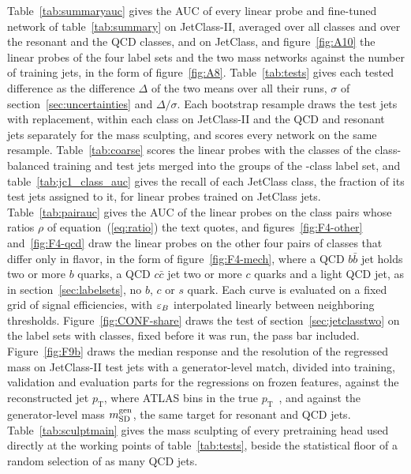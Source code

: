 Table~\ref{tab:summaryauc} gives the AUC of every linear probe and fine-tuned network of table~\ref{tab:summary}
on JetClass-II, averaged over all classes and over the resonant and the QCD classes, and on JetClass, and
figure~\ref{fig:A10} the linear probes of the four label sets and the two mass networks
against the number of training jets, in the form of figure~\ref{fig:A8}. Table~\ref{tab:tests} gives each tested
difference as the difference $\Delta$ of the two means over all their runs, $\sigma$ of
section~\ref{sec:uncertainties} and $\Delta/\sigma$. Each bootstrap resample draws the test jets with replacement,
within each class on JetClass-II and the QCD and resonant jets separately for the mass sculpting, and scores every
network on the same resample. Table~\ref{tab:coarse} scores the linear probes with the \Kfull{} classes of the
class-balanced training and test jets merged into the \Kcoarse{} groups of the \Kcoarse-class label set, and
table~\ref{tab:jc1_class_auc} gives the recall of
each JetClass class, the fraction of its test jets assigned to it, for linear probes trained on \FtSizeESix{}
JetClass jets. Table~\ref{tab:pairauc} gives the AUC of the linear probes on the class pairs whose ratios $\rho$ of
equation~(\ref{eq:ratio}) the text quotes, and figures~\ref{fig:F4-other} and~\ref{fig:F4-qcd} draw the linear probes on the other four pairs of
classes that differ only in flavor, in the form of figure~\ref{fig:F4-mech}, where a QCD $b\bar b$ jet holds two or more $b$ quarks, a
QCD $c\bar c$ jet two or more $c$ quarks and a light QCD jet, as in section~\ref{sec:labelsets}, no $b$, $c$ or $s$ quark. Each curve is evaluated on
a fixed grid of signal efficiencies, with $\varepsilon_B$ interpolated linearly between neighboring thresholds.
Figure~\ref{fig:CONF-share} draws the test of section~\ref{sec:jetclasstwo} on the label sets with \Kcoarse{}
classes, fixed before it was run, the pass bar included.
Figure~\ref{fig:F9b} draws the median response and the resolution of the regressed mass on JetClass-II test jets
with a generator-level match, divided into training, validation and evaluation parts for the regressions on
frozen features, against the reconstructed jet $p_{\mathrm T}$, where ATLAS bins in the true
$p_{\mathrm T}$~\cite[Sec.~6]{atlasregression}, and against the generator-level mass $m^{\mathrm{gen}}_{\mathrm{SD}}$, the same target for
resonant and QCD jets. Table~\ref{tab:sculptmain} gives the mass sculpting of every pretraining head used directly at
the working points of table~\ref{tab:tests}, beside the statistical floor of a random selection of as many QCD jets.

